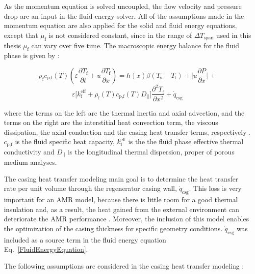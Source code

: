 \documentclass[review,preprint,12pt]{elsarticle}
\begin{document}
As the momentum equation is solved uncoupled, the flow velocity and pressure drop are an input in the fluid energy solver. All of the assumptions made in the momentum equation are also applied for the solid and fluid energy equations, except that $\mu_\textrm{f}$ is not considered constant, since in the range of $\Delta T_\textrm{span}$ used in this thesis $\mu_\textrm{f}$ can vary over five time. The macroscopic energy balance for the fluid phase is given by \cite{Engelbrecht2004,Trevizoli2015}:

\begin{equation}
\rho_\textrm{f} c_\textrm{p,f}(T) \left( \varepsilon \frac{\partial T_\textrm{f}}{\partial t} +  u\frac{\partial T_\textrm{f}}{\partial x} \right) = h(x)\beta(T_\textrm{s}-T_\textrm{f})  + \Biggl|u\frac{\partial P}{\partial x}\Biggr| + \nonumber
\end{equation}
\begin{equation}
\varepsilon\bigl[k^\textrm{eff}_\textrm{f} + \rho_\textrm{f}(T) c_\textrm{p,f}(T)D_{||}\bigr]\frac{\partial^{2} T_\textrm{f}}{\partial x^{2}} +  \dot{q}_\textrm{csg}
\label{FluidEnergyEquation}
\end{equation}

\noindent where the terms on the left are the thermal inertia and axial advection, and the terms on the right are the interstitial heat convection term, the viscous dissipation, the axial conduction and the casing heat transfer terms, respectively \cite{Kaviany1995, Nield2006}. $c_\textrm{p,f}$ is the fluid specific heat capacity, $k^\textrm{eff}_\textrm{f}$ is the the fluid phase effective thermal conductivity and $D_{||}$ is the longitudinal thermal dispersion, proper of porous medium analyses.

The casing heat transfer modeling main goal is to determine the heat transfer rate per unit volume through the regenerator casing wall, $\dot{q}_\textrm{csg}$. This loss is  very important for an AMR model, because there is little room for a good thermal insulation and, as a result, the heat gained from the external environment can deteriorate the AMR performance \cite{Engelbrecht2008,Trevizoli2014,Trevizoli2016b}. Moreover, the inclusion of this model enables the optimization of the casing thickness for specific geometry conditions. $\dot{q}_\textrm{csg}$ was included as a source term in the fluid energy equation Eq.~\eqref{FluidEnergyEquation}. 

The following assumptions are considered in the casing heat transfer modeling \cite{Trevizoli2015}:
\end{document}
